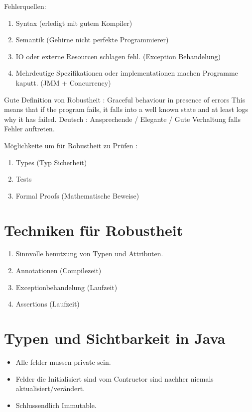 \documentclass[a4paper,10pt]{scrreprt}
\begin{document}
Fehlerquellen: \\
\begin{enumerate}
\item Syntax (erledigt mit gutem Kompiler)
\item Semantik (Gehirne nicht perfekte Programmierer)
\item IO oder externe Resourcen schlagen fehl. (Exception Behandelung)
\item Mehrdeutige Spezifikationen oder implementationen machen Programme kaputt. (JMM + Concurrency)
\end{enumerate}

\begin{framed}
 Gute Definition von Robustheit : Graceful behaviour in presence of errors
This means that if the program fails, it falls into a well known state and at
least logs why it has failed.
Deutsch : Ansprechende / Elegante / Gute Verhaltung falls Fehler auftreten.
\end{framed}

Möglichkeite um für Robustheit zu Prüfen : \\
\begin{enumerate}
 \item Types (Typ Sicherheit)
 \item Tests
 \item Formal Proofs (Mathematische Beweise)
\end{enumerate}


\section{Techniken für Robustheit}
\begin{enumerate}
 \item Sinnvolle benutzung von Typen und Attributen.
 \item Annotationen (Compilezeit)
 \item Exceptionbehandelung (Laufzeit)
 \item Assertions (Laufzeit)
\end{enumerate}

\section{Typen und Sichtbarkeit in Java}
\begin{itemize}
 \item Alle felder mussen private sein.
 \item Felder die Initialisiert sind vom Contructor sind nachher niemals aktualisiert/verändert.
 \item Schlussendlich Immutable. 
\end{itemize}
\end{document}

